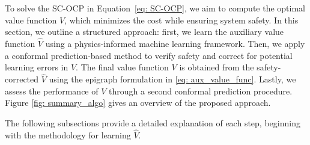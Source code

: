 
To solve the SC-OCP in Equation~\eqref{eq: SC-OCP}, we aim to compute the optimal value function $V$, which minimizes the cost while ensuring system safety. In this section, we outline a structured approach: first, we learn the auxiliary value function $\hat{V}$ using a physics-informed machine learning framework. Then, we apply a conformal prediction-based method to verify safety and correct for potential learning errors in $\hat{V}$. The final value function $V$ is obtained from the safety-corrected $\hat{V}$ using the epigraph formulation in \eqref{eq: aux_value_func}. Lastly, we assess the performance of $V$ through a second conformal prediction procedure. Figure \ref{fig: summary_algo} gives an overview of the proposed approach.

The following subsections provide a detailed explanation of each step, beginning with the methodology for learning $\hat{V}$.


